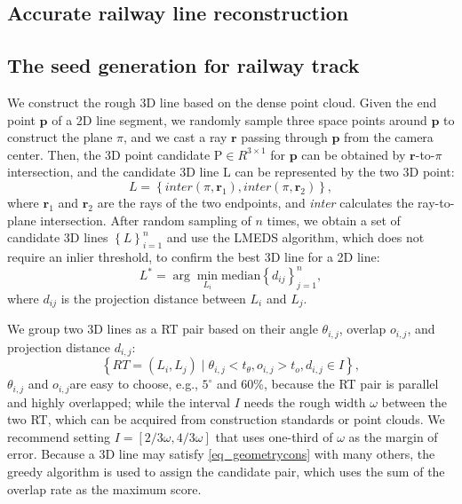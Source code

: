 \subsection{Accurate railway line reconstruction}
\label{sec_linereconstruction}

\subsection{The seed generation for railway track}
We construct the rough 3D line based on the dense point cloud.
Given the end point $\mathbf p$ of a 2D line segment,
we randomly sample three space points around $\mathbf p$ to construct the plane $\pi$,
and we cast a ray $\mathbf r$ passing through $\mathbf p$ from the camera center.
Then,
the 3D point candidate $\mathrm P \in R ^ {3\times1}$ for $\mathbf p$ can be obtained by $\mathbf r$-to-$\pi$ intersection,
and the candidate 3D line $\mathrm L$ can be represented by the two 3D point:
\begin{equation}
    L =\left\{\textit{inter} \left(\pi,\mathbf r_1\right),\textit{inter} \left(\pi,\mathbf r_2\right)  \right\},
\end{equation}
where $\mathbf r_1$ and $\mathbf r_2$ are the rays of the two endpoints,
and \textit{inter} calculates the ray-to-plane intersection.
After random sampling of $n$ times,
we obtain a set of candidate 3D lines $\left\{ L\right\}_{i=1}^n$ and use the LMEDS algorithm,
which does not require an inlier threshold, to confirm the best 3D line for a 2D line:
\begin{equation}
    L^* = \arg\min_{L_i} \text{median} \left\{ d_{ij}\right\}_{j=1}^n ,
\end{equation}
where $d_{ij}$ is the projection distance between $L_i$ and $L_j$.  

We group two 3D lines as a RT pair based on their angle $\theta_{i,j}$,
overlap $o_{i,j}$,
and projection distance $d_{i,j}$:
\begin{equation}
   \left\{ RT= \left(L_i, L_j\right) \mid \theta_{i,j} < t_\theta, o_{i,j} > t_o, d_{i,j} \in I  \right\},
    \label{eq_geometrycons}
\end{equation}
$\theta_{i,j}$ and $o_{i,j}$are easy to choose,
e.g.,
$5^\circ$ and 60\%,
because the RT pair is parallel and highly overlapped;
while the interval $I$ needs the rough width $\omega$ between the two RT,
which can be acquired from construction standards or point clouds.
We recommend setting $I=\left[2/3\omega,4/3\omega\right]$ that uses one-third of $\omega$ as the margin of error.
Because a 3D line may satisfy \cref{eq_geometrycons} with many others,
the greedy algorithm is used to assign the candidate pair,
which uses the sum of the overlap rate as the maximum score.

